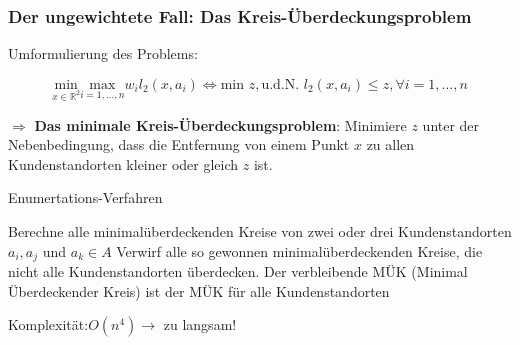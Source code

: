       \subsubsection{Der ungewichtete Fall: Das Kreis-Überdeckungsproblem} %
      \label{ssub:der_ungewichtete_fall_das_kreis_überdeckungsproblem}
        \par Umformulierung des Problems:

        \[
          \underset{x \in \mathbb{R}^2}{\text{min}} \underset{i = 1,\dots, n}{\text{max}}w_il_2(x,a_i) \Leftrightarrow \text{min } z, \text{u.d.N. } l_2(x, a_i) \leq z, \forall i = 1, \dots, n
        \]

        \par $\Rightarrow$ \textbf{Das minimale Kreis-Überdeckungsproblem}: Minimiere $z$ unter der Nebenbedingung, dass die Entfernung von einem Punkt $x$ zu allen Kundenstandorten kleiner oder gleich $z$ ist.

        \begin{algorithm}[H]
          \begin{algorithmic}[1]
            \caption{Enumertations-Verfahren}
              \State Berechne alle minimalüberdeckenden Kreise von zwei oder drei Kundenstandorten $a_i, a_j$ und $a_k \in A$
              \State Verwirf alle so gewonnen minimalüberdeckenden Kreise, die nicht alle Kundenstandorten überdecken.
              \State Der verbleibende MÜK (Minimal Überdeckender Kreis) ist der MÜK für alle Kundenstandorten
            \end{algorithmic}
        \end{algorithm}

        \par Komplexität:$O(n^4) \rightarrow$ zu langsam!

